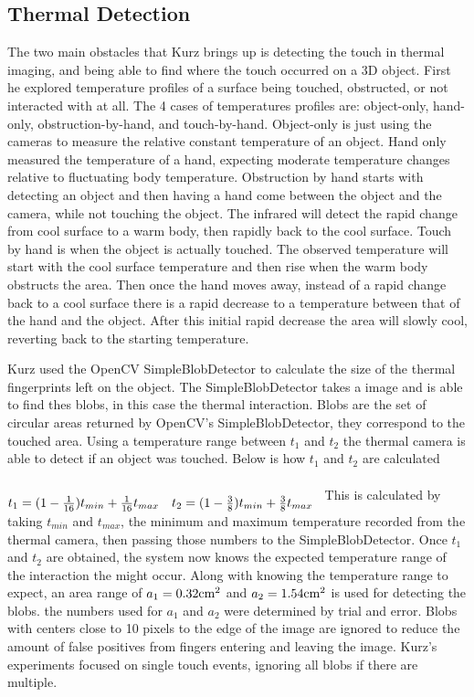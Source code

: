 \documentclass{sig-alternate}
\begin{document}
\subsection{Thermal Detection}
\label{Thermal Detection}
The two main obstacles that Kurz brings up is detecting the touch in thermal imaging, and being able to find where the touch occurred on a 3D object. First he explored temperature profiles of a surface being touched, obstructed, or not interacted with at all. The 4 cases of temperatures profiles are: object-only, hand-only, obstruction-by-hand, and touch-by-hand. Object-only is just using the cameras to measure the relative constant temperature of an object. Hand only measured the temperature of a hand, expecting moderate temperature changes relative to fluctuating body temperature. Obstruction by hand starts with detecting an object and then having a hand come between the object and the camera, while not touching the object. The infrared will detect the rapid change from cool surface to a warm body, then rapidly back to the cool surface. Touch by hand is when the object is actually touched. The observed temperature  will start with the cool surface temperature and then rise when the warm body obstructs the area. Then once the hand moves away, instead of a rapid change back to a cool surface there is a rapid decrease to a temperature between that of the hand and the object. After this initial rapid decrease the area will slowly cool, reverting back to the starting temperature. 

Kurz used the OpenCV SimpleBlobDetector to calculate the size of the thermal fingerprints left on the object. The SimpleBlobDetector takes a image and is able to find thes blobs, in this case the thermal interaction. Blobs are the set of circular areas returned by OpenCV's SimpleBlobDetector, they correspond to the touched area. Using a temperature range between \(t_1\) and \(t_2\) the thermal camera is able to detect if an object was touched. Below is how \(t_1\) and \(t_2\) are calculated

\(
\begin{matrix} \\
 t_{1}=(1-{1\over 16})t_{ min}+{1\over 16}t_{ max} & t_{2}=(1-{3\over 8})t_{ min}+{3\over 8}t_{ max}\cr 
 \end{matrix} \\\\
\)
This is calculated by taking \(t_{min}\) and \(t_{max}\), the minimum and maximum temperature recorded from the thermal camera, then passing those numbers to the SimpleBlobDetector. Once \(t_1\) and \(t_2\) are obtained, the system now knows the expected temperature range of the interaction the might occur. Along with knowing the temperature range to expect, an area range of \(a_{1}=0.32{\rm cm}^{2}\) and \(a_{2}=1.54{\rm cm}^{2}\) is used for detecting the blobs. the numbers used for \(a_{1}\) and \(a_{2}\) were determined by trial and error. Blobs with centers close to 10 pixels to the edge of the image are ignored to reduce the amount of false positives from fingers entering and leaving the image. Kurz's experiments focused on single touch events, ignoring all blobs if there are multiple.
\end{document}
